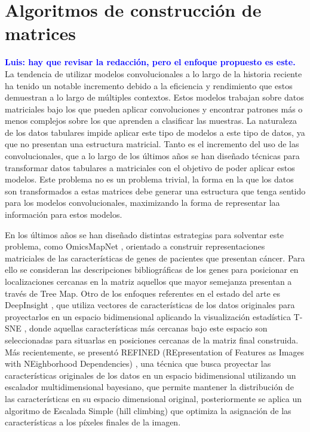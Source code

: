 \documentclass{uathesis-es}
\begin{document}
\section{Algoritmos de construcción de matrices}
\label{SOAT_MATRIX_ALGORITHM_CONSTRUCTION}

\textcolor{blue}{\textbf{Luis: hay que revisar la redacción, pero el enfoque propuesto es este.}}\\

La tendencia de utilizar modelos convolucionales a lo largo de la historia reciente ha tenido un notable incremento debido a la eficiencia y rendimiento que estos demuestran a lo largo de múltiples contextos. Estos modelos trabajan sobre datos matriciales bajo los que pueden aplicar convoluciones y encontrar patrones más o menos complejos sobre los que aprenden a clasificar las muestras. La naturaleza de los datos tabulares impide aplicar este tipo de modelos a este tipo de datos, ya  que no presentan una estructura matricial. Tanto es el incremento del uso de las convolucionales, que a lo largo de los últimos años se han diseñado técnicas para transformar datos tabulares a matriciales con el objetivo de poder aplicar estos modelos. Este problema no es un problema trivial, la forma en la que los datos son transformados a estas matrices debe generar una estructura que tenga sentido para los modelos convolucionales, maximizando la forma de representar laa información para estos modelos. 

En los últimos años se han diseñado distintas estrategias para solventar este problema, como OmicsMapNet \cite{ma2019omicsmapnet}, orientado a construir representaciones matriciales de las características de genes de pacientes que presentan cáncer. Para ello se consideran las descripciones bibliográficas de los genes para posicionar en localizaciones cercanas en la matriz aquellos que mayor semejanza presentan a través de Tree Map. Otro de los enfoques referentes en el estado del arte es DeepInsight \cite{Sharma2019}, que utiliza vectores de características de los datos originales para proyectarlos en un espacio bidimensional aplicando la visualización estadística T-SNE \cite{van2008visualizing}, donde aquellas características más cercanas bajo este espacio son seleccionadas para situarlas en posiciones cercanas de la matriz final construida. Más recientemente, se presentó REFINED (REpresentation of Features as Images with NEighborhood Dependencies) \cite{Bazgir2020}, una técnica que busca proyectar las características originales de los datos en un espacio bidimensional utilizando un escalador multidimensional bayesiano, que permite mantener la distribución de las características en su espacio dimensional original, posteriormente se aplica un algoritmo de Escalada Simple (hill climbing) que optimiza la asignación de las características a los píxeles finales de la imagen.
\end{document}
